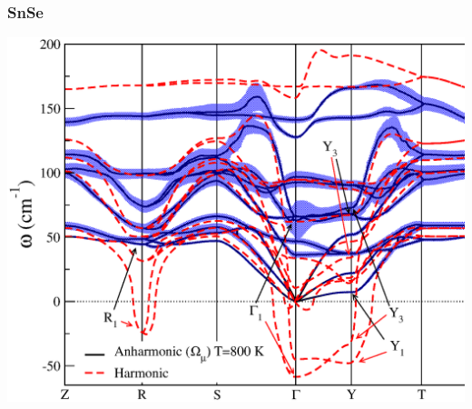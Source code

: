 \documentclass{beamer}
\begin{document}

\begin{frame}

\frametitle{SnSe}
\begin{center}
 \includegraphics[width=0.85\linewidth]{Pictures/SnSe/spectrum-snse.eps}
\end{center}
 
\end{frame}

\end{document}
